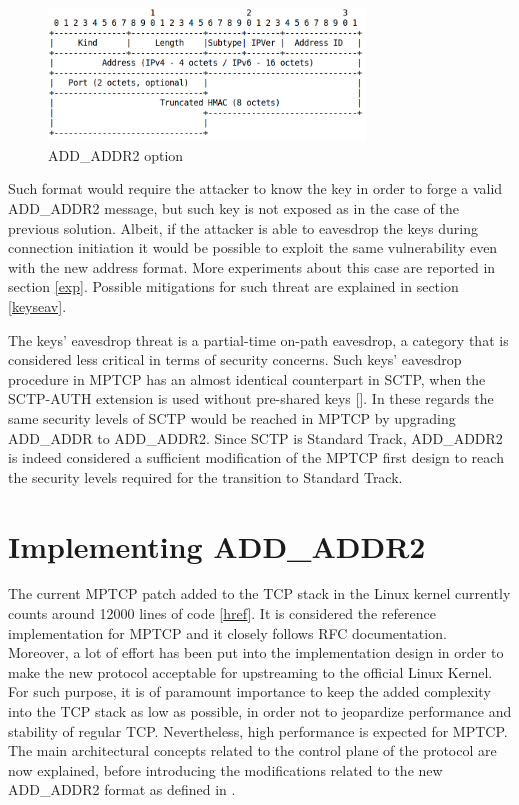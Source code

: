 \begin{figure}[!htb]
\centering
\includegraphics[width=0.75\textwidth]{images/addaddr2}
\caption{ADD\_ADDR2 option}
\label{fig:addaddr2}
\end{figure}

Such format would require the attacker to know the key in order to forge a valid ADD\_ADDR2 message, but such key is not exposed as in the case of the previous solution. Albeit, if the attacker is able to eavesdrop the keys during connection initiation it would be possible to exploit the same vulnerability even with the new address format. More experiments about this case are reported in section \ref{exp}. Possible mitigations for such threat are explained in section \ref{keyseav}.

The keys' eavesdrop threat is a partial-time on-path eavesdrop, a category that is considered less critical in terms of security concerns. Such keys' eavesdrop procedure in MPTCP has an almost identical counterpart in SCTP, when the SCTP-AUTH extension is used without pre-shared keys []. In these regards the same security levels of SCTP would be reached in MPTCP by upgrading ADD\_ADDR to ADD\_ADDR2. Since SCTP is Standard Track, ADD\_ADDR2 is indeed considered a sufficient modification of the MPTCP first design to reach the security levels required for the transition to Standard Track.

\section{Implementing ADD\_ADDR2}
The current MPTCP patch added to the TCP stack in the Linux kernel currently counts around 12000 lines of code [\href{http://multipath-tcp.org/mptcp_stats/index.html}{href}]. It is considered the reference implementation for MPTCP and it closely follows RFC documentation. Moreover, a lot of effort has been put into the implementation design in order to make the new protocol acceptable for upstreaming to the official Linux Kernel. For such purpose, it is of paramount importance to keep the added complexity into the TCP stack as low as possible, in order not to jeopardize performance and stability of regular TCP. Nevertheless, high performance is expected for MPTCP. The main architectural concepts related to the control plane of the protocol are now explained, before introducing the modifications related to the new ADD\_ADDR2 format as defined in . 

